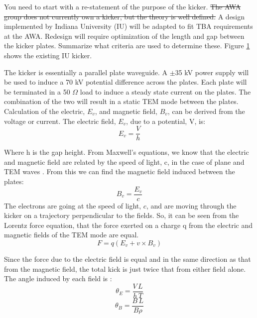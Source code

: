 \documentclass{iitthesis}
\newcommand{\lsnote}[1]{\textsf{{\color{violet}{ LS note:}   #1 }}}
\begin{document}

\lsnote{You need to start with a re-statement of the purpose of the kicker. \sout{The AWA group does not currently own a kicker, but the theory is well defined.}} 
A design implemented by Indiana University (IU) \cite{iukicker}
will be adapted to fit TBA requirements at the AWA. Redesign will require optimization
of the length and gap between the kicker plates. \lsnote{Summarize what criteria are used to determine these.} Figure \ref{fig:IUkicker} shows the existing IU kicker.
\begin{figure}[h]
	\begin{center}
		\label{fig:IUkicker}
	\end{center}
\end{figure}
The kicker is essentially a parallel plate waveguide. 
A $\pm$35 kV power supply will be used to induce a 70 kV potential difference 
across the plates. Each plate will be terminated in a 50 $\Omega$ load to induce a steady 
state current on the plates. The combination of the two will result in a static TEM mode 
between the plates. Calculation of the electric, $E_v$, and magnetic field, $B_v$,
can be derived from the voltage or current. The electric field, $E_v$, due to a potential, V, is: 
\begin{equation}
E_v=\frac{V}{h}
\end{equation}

Where h is the gap height. From Maxwell's equations, we know that the electric and magnetic 
field are related by the speed of light, c, in the case of plane and TEM waves \cite{pozar}. 
From this we can find the magnetic field induced between the plates: 
\begin{equation}
B_v=\frac{E_v}{c}
\end{equation}
The electrons are going at the speed of light, $c$, and are moving through the kicker on a 
trajectory perpendicular to the fields.  So, it can be seen from the Lorentz force equation, that the force 
exerted on a charge q from the electric and magnetic fields of the TEM mode are equal. 
\begin{equation}
F=q(E_v+v\times B_v)
\end{equation}

Since the force due to the electric field is equal and in the same direction as that from the magnetic field, 
the total kick is just twice that from either field alone.  The angle induced by each field is \cite{iukicker, Wiedemann}:  
\begin{equation}
\theta_E= \frac{V\,L}{h\,T}
\end{equation}
\begin{equation}
\theta_B= \frac{B\,L}{B\rho}
\end{equation}
\end{document}
